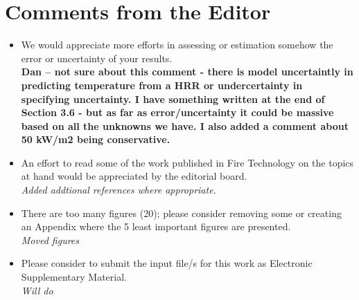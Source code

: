 \documentclass[12pt]{article}
\begin{document}
\section{Comments from the Editor}
\begin{itemize}
\item We would appreciate more efforts in assessing or estimation somehow the error or uncertainty of your results. \\
{\bf Dan -- not sure about this comment - there is model uncertaintly in predicting temperature from a HRR or undercertainty in specifying uncertainty. I have something written at the end of Section 3.6 - but as far as error/uncertainty it could be massive based on all the unknowns we have. I also added a comment about 50 kW/m2 being conservative.}
\item An effort to read some of the work published in Fire Technology on the topics at hand would be appreciated by the editorial board. \\
{\it Added addtional references where appropriate.}
\item There are too many figures (20); please consider removing some or creating an Appendix where the 5 least important figures are presented. \\
{\it Moved figures}
\item Please consider to submit the input file/s for this work as Electronic Supplementary Material. \\
{\it Will do}
\end{itemize}
\end{document}
